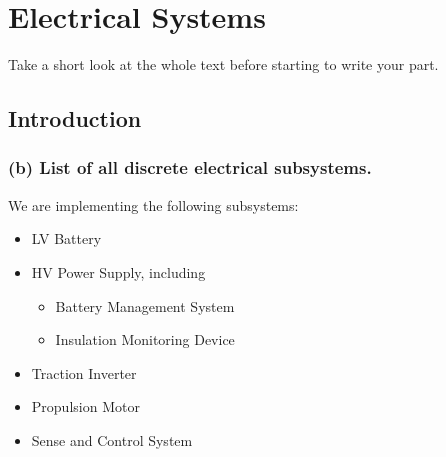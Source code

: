 \chapter{Electrical Systems}
\graphicspath{ {./texfiles/electrical/eimc/} }
Take a short look at the whole text before starting to write your part.
\section{Introduction}

\subsection{(b) List of all discrete electrical subsystems.}
We are implementing the following subsystems: 
\begin{itemize}
    \item LV Battery
    \item HV Power Supply, including \begin{itemize}
        \item Battery Management System
        \item Insulation Monitoring Device
    \end{itemize}
    \item Traction Inverter
    \item Propulsion Motor    
    \item Sense and Control System
\end{itemize}

